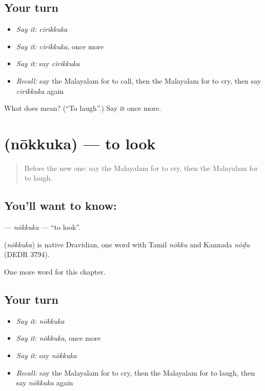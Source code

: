 \subsection*{Your turn}
\begin{itemize}
\raggedright
  \item \emph{Say it:} \emph{cirikkuka}
  \item \emph{Say it:} \emph{cirikkuka}, once more
  \item \emph{Say it:} say \emph{cirikkuka}
  \item \emph{Recall:} say the Malayalam for to call, then the Malayalam for to cry, then say \emph{cirikkuka} again
\end{itemize}

\begin{tcolorbox}[breakable,colback=teal!4,colframe=teal!35!black,title={Before you move on}]
What does  mean? (\textquotedblleft{}To laugh\textquotedblright{}.) Say it once more.
\end{tcolorbox}
\section[\texorpdfstring{\ml{നോക്കുക} (nōkkuka)}{നോക്കുക (nōkkuka)}]{ (nōkkuka) — to look}

\label{lesson:ML-C173-nokkuka}



\begin{quote}
Before the new one: say the Malayalam for to cry, then the Malayalam for to laugh.
\end{quote}

\subsection*{You'll want to know: }
\textbf{} — \emph{nōkkuka} — \textquotedblleft{}to look\textquotedblright{}.

\begin{cousinweb}
\textbf{} (\emph{nōkkuka}) is native Dravidian, one word with Tamil \emph{nōkku} and Kannada \emph{nōḍu} (DEDR 3794).
\end{cousinweb}

\begin{grammarlens}[title={What you've built}]
One more word for this chapter.
\end{grammarlens}

\subsection*{Your turn}
\begin{itemize}
\raggedright
  \item \emph{Say it:} \emph{nōkkuka}
  \item \emph{Say it:} \emph{nōkkuka}, once more
  \item \emph{Say it:} say \emph{nōkkuka}
  \item \emph{Recall:} say the Malayalam for to cry, then the Malayalam for to laugh, then say \emph{nōkkuka} again
\end{itemize}

